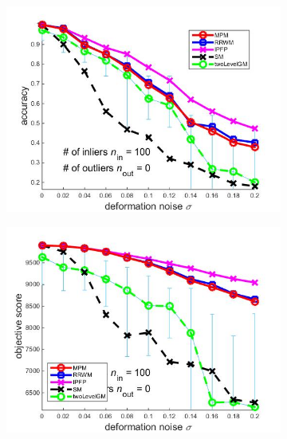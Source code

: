\documentclass[
	fontsize=12pt,
	paper=a4,
	twoside=false,
	numbers=noenddot,
	plainheadsepline,
	toc=listof,
	toc=bibliography
]{scrartcl}
\begin{document}
\begin{figure}[h] 
	\begin{subfigure}[b]{0.3\textwidth}
		\centering
		\includegraphics[scale=0.25]{"fig_ver2608/syntheticPointSets/ver4.3.1/deformation/accuracy_avg10t"} 
	\end{subfigure}%
	\begin{subfigure}[b]{0.3\textwidth}
		\centering
		\includegraphics[scale=0.25]{"fig_ver2608/syntheticPointSets/ver4.3.1/deformation/score_avg10t"} 
	\end{subfigure} 
	\begin{subfigure}[b]{0.3\textwidth}
		\centering

\end{subfigure}
\end{figure}
\end{document}
